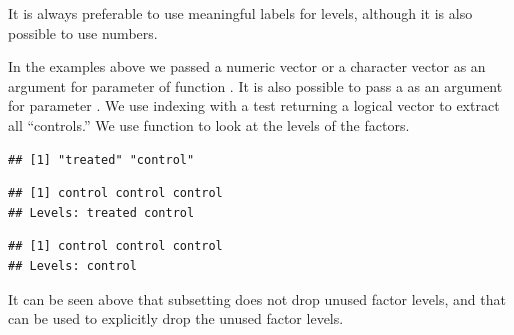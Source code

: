 \documentclass[krantz2]{krantz}\usepackage{knitr}
\begin{document}
It is always preferable to use meaningful labels for levels, although it is also possible to use numbers.

In the examples above we passed a numeric vector or a character vector as an argument for parameter  of function . It is also possible to pass a  as an argument for parameter . We use indexing with a test returning a logical vector to extract all ``controls.'' We use function  to look at the levels of the factors.

\begin{knitrout}\footnotesize
{}\color{fgcolor}\begin{kframe}
\begin{alltt}
\end{alltt}
\begin{verbatim}
## [1] "treated" "control"
\end{verbatim}
\begin{alltt}
 \hlkwb{<-} \hlstd{my.factor[my.factor} \hlopt{==} \hlstd{]}
\end{alltt}
\begin{verbatim}
## [1] control control control
## Levels: treated control
\end{verbatim}
\begin{alltt}
 \hlkwb{<-} 
\end{alltt}
\begin{verbatim}
## [1] control control control
## Levels: control
\end{verbatim}
\end{kframe}
\end{knitrout}

It can be seen above that subsetting does not drop unused factor levels, and that  can be used to explicitly drop the unused factor levels.
\end{document}

